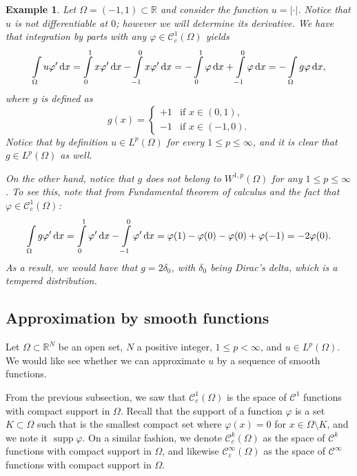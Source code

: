 \documentclass[a4paper,doc,11pt]{article}
\newtheorem{example}[theorem]{Example}
\newcommand{\R}{\mathbb{R}}
\newcommand{\CC}{\mathcal{C}}
\DeclareMathOperator{\supp}{supp}
\begin{document}
\begin{example}
    Let \(\Omega = (-1,1) \subset \R\) and consider the function \( u = |\cdot|\). Notice that \(u\) is not differentiable at \(0\); however we will determine its derivative. We have that integration by parts with any \(\varphi \in \CC_c^1 (\Omega)\) yields
    \begin{align*}
        \int\limits_\Omega u \varphi' \dif x
        =
        \int\limits_{0}^1 x \varphi'  \dif x
        -
        \int\limits_{-1}^0 x \varphi'  \dif x
        = 
        -\int\limits_{0}^1 \varphi  \dif x
        +
        \int\limits_{-1}^0 \varphi  \dif x
        =
        -\int\limits_\Omega g \varphi \dif x,
    \end{align*}
    where \(g\) is defined as
    \[
        g(x) = 
        \begin{cases}
            +1 & \text{if } x\in (0,1),
            \\
            -1 & \text{if } x\in (-1,0).
        \end{cases}
    \]
    Notice that by definition \(u\in L^p(\Omega)\) for every \(1 \leq p\leq \infty \), and it is clear that \(g \in L^p (\Omega)\) as well. 
    
    On the other hand, notice that \(g\) does \emph{not} belong to \( W^{1,p}(\Omega)\) for any \(1\leq p \leq \infty\). To see this, note that from Fundamental theorem of calculus and the fact that \(\varphi \in \CC_c^1 (\Omega)\):
    \[
        \int\limits_\Omega g \varphi' \dif x
        =
        \int\limits_0^1 \varphi' \dif x - \int\limits_{-1}^0 \varphi' \dif x
        =
        \varphi(1) - \varphi(0)  - \varphi(0) + \varphi(-1) = -2 \varphi(0).
    \]
    As a result, we would have that \( g = 2 \delta_0\), with \(\delta_0\) being Dirac's delta, which is a tempered distribution.
\end{example}


\subsection{Approximation by smooth functions}

Let \(\Omega \subset \R^N\) be an open set, \(N\) a positive integer, \( 1\leq p < \infty\), and \( u \in L^p (\Omega)\). We would like see whether we can approximate \(u\) by a sequence of smooth functions.

From the previous subsection, we saw that \(\CC_c^1 (\Omega)\) is the space of \(\CC^1\) functions with compact support in \(\Omega\). Recall that the support of a function \(\varphi\) is a set \( K \subset \Omega\) such that is the smallest compact set where \( \varphi (x) = 0\) for \( x\in \Omega \setminus K\), and we note it \(\supp \varphi\). On a similar fashion, we denote \(\CC_c^k (\Omega)\) as the space of \(\CC^k\) functions with compact support in \(\Omega\), and likewise \(\CC_c^\infty(\Omega)\) as the space of \(\CC^\infty\) functions with compact support in \(\Omega\).
\end{document}
